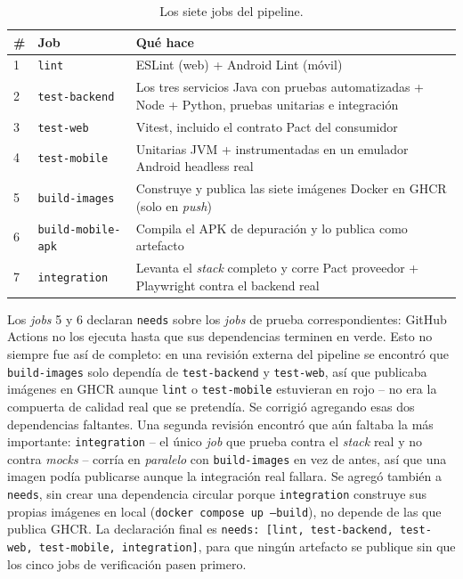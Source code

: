 \begin{table}[H]
\centering
\small
\caption{Los siete jobs del pipeline.}
\label{tab:cicd}
\begin{tabular}{@{}p{0.6cm}p{2.6cm}p{9.5cm}@{}}
\toprule
\textbf{\#} & \textbf{Job} & \textbf{Qué hace} \\
\midrule
1 & \texttt{lint} & ESLint (web) + Android Lint (móvil) \\
2 & \texttt{test-backend} & Los tres servicios Java con pruebas automatizadas + Node + Python, pruebas unitarias e integración \\
3 & \texttt{test-web} & Vitest, incluido el contrato Pact del consumidor \\
4 & \texttt{test-mobile} & Unitarias JVM + instrumentadas en un emulador Android headless real \\
5 & \texttt{build-images} & Construye y publica las siete imágenes Docker en GHCR (solo en \emph{push}) \\
6 & \texttt{build-mobile-apk} & Compila el APK de depuración y lo publica como artefacto \\
7 & \texttt{integration} & Levanta el \emph{stack} completo y corre Pact proveedor + Playwright contra el backend real \\
\bottomrule
\end{tabular}
\end{table}

Los \emph{jobs} 5 y 6 declaran \texttt{needs} sobre los \emph{jobs} de prueba correspondientes:
GitHub Actions no los ejecuta hasta que sus dependencias terminen en verde. Esto no siempre fue
así de completo: en una revisión externa del pipeline se encontró que \texttt{build-images} solo
dependía de \texttt{test-backend} y \texttt{test-web}, así que publicaba imágenes en GHCR aunque
\texttt{lint} o \texttt{test-mobile} estuvieran en rojo -- no era la compuerta de calidad real que
se pretendía. Se corrigió agregando esas dos dependencias faltantes. Una segunda revisión
encontró que aún faltaba la más importante: \texttt{integration} -- el único \emph{job} que
prueba contra el \emph{stack} real y no contra \emph{mocks} -- corría en \emph{paralelo} con
\texttt{build-images} en vez de antes, así que una imagen podía publicarse aunque la integración
real fallara. Se agregó también a \texttt{needs}, sin crear una dependencia circular porque
\texttt{integration} construye sus propias imágenes en local (\texttt{docker compose up
--build}), no depende de las que publica GHCR. La declaración final es
\texttt{needs: [lint, test-backend, test-web, test-mobile, integration]}, para que ningún
artefacto se publique sin que los cinco jobs de verificación pasen primero.

